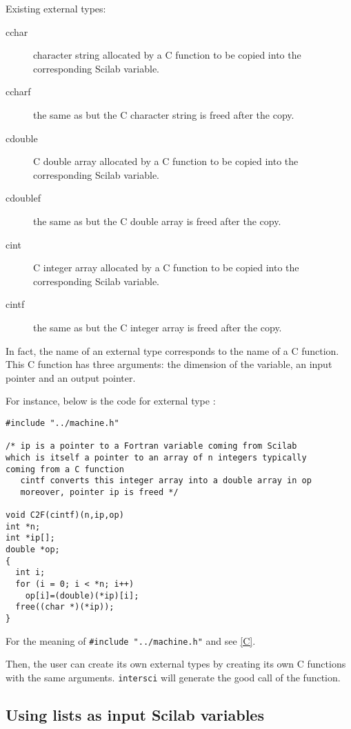 \smallskip

Existing external types:
\begin{description}
 \item[cchar] character string allocated by a C function to be copied into the
corresponding Scilab variable.
 \item[ccharf] the same as  but the C character string is freed after
the copy.
 \item[cdouble] C double array allocated by a C function to be copied into the
corresponding Scilab variable.
 \item[cdoublef] the same as  but the C double array is freed after
the copy.
 \item[cint] C integer array allocated by a C function to be copied into the
corresponding Scilab variable.
 \item[cintf] the same as  but the C integer array is freed after
the copy.
\end{description}

\medskip

In fact, the name of an external type corresponds to the name of a C function.
This C function has three arguments: the dimension of the variable, an input
pointer and an output pointer.

For instance, below is the code for external type :
\begin{verbatim}
#include "../machine.h"   

/* ip is a pointer to a Fortran variable coming from Scilab
which is itself a pointer to an array of n integers typically
coming from a C function
   cintf converts this integer array into a double array in op 
   moreover, pointer ip is freed */

void C2F(cintf)(n,ip,op)
int *n;
int *ip[];
double *op;
{
  int i;
  for (i = 0; i < *n; i++)
    op[i]=(double)(*ip)[i];
  free((char *)(*ip));
}
\end{verbatim}

For the meaning of \verb|#include "../machine.h"| and  see \ref{C}.

\smallskip

Then, the user can create its own external types by creating its own C
functions with the same arguments. {\tt intersci} will generate the good call of the
function. 

\subsection{Using lists as input Scilab variables}
\label{list}

